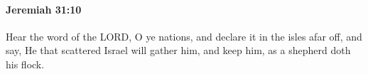 
		\paragraph{Jeremiah 31:10} %
			\label{JEREMIAH-31-10}

			Hear the word of the LORD, O ye nations, and declare it in the isles afar off, and say, He that scattered Israel will gather him, and keep him, as a shepherd doth his flock.


